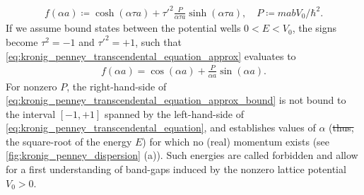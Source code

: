 \documentclass{svmono}
\providecommand{\DIFdeltex}[1]{{\protect\color{red}\sout{#1}}}                      %
\providecommand{\DIFdelbegin}{} %
\providecommand{\DIFdelend}{} %
\providecommand{\DIFdel}[1]{\texorpdfstring{\DIFdeltex{#1}}{}} %
\newcommand{\DIFscaledelfig}{0.5}
\newlength{\DIFdelgraphicswidth} %
\newlength{\DIFdelgraphicsheight} %
\newcommand{\DIFdelincludegraphics}[2][]{%
\sbox{\DIFdelgraphicsbox}{\DIFOincludegraphics[#1]{#2}}%
\settoboxwidth{\DIFdelgraphicswidth}{\DIFdelgraphicsbox} %
\settoboxtotalheight{\DIFdelgraphicsheight}{\DIFdelgraphicsbox} %
\scalebox{\DIFscaledelfig}{%
\parbox[b]{\DIFdelgraphicswidth}{\usebox{\DIFdelgraphicsbox}\\[-\baselineskip] \rule{\DIFdelgraphicswidth}{0em}}\llap{\resizebox{\DIFdelgraphicswidth}{\DIFdelgraphicsheight}{%
\setlength{\unitlength}{\DIFdelgraphicswidth}%
\begin{picture}(1,1)%
\thicklines\linethickness{2pt} %
{\color[rgb]{1,0,0}\put(0,0){\framebox(1,1){}}}%
{\color[rgb]{1,0,0}\put(0,0){\line( 1,1){1}}}%
{\color[rgb]{1,0,0}\put(0,1){\line(1,-1){1}}}%
\end{picture}%
}\hspace*{3pt}}} %
} %
\DeclareRobustCommand{\DIFdelbegin}{\DIFOdelbegin \let\includegraphics\DIFdelincludegraphics} %
\DeclareRobustCommand{\DIFdelend}{\DIFOaddend \let\includegraphics\DIFOincludegraphics} %
\begin{document}
\begin{align}
    f(\alpha a) \coloneqq \cosh(\alpha\tau a) + \tau'^2\frac{P}{\alpha\tau a}\sinh(\alpha\tau a),
    \quad
    P \coloneqq mabV_0/\hbar^2.
    \label{eq:kronig_penney_transcendental_equation_approx}
\end{align}
If we assume bound states between the potential wells $0<E<V_0$, the signs become $\tau^2=-1$ and $\tau'^2=+1$, such that \cref{eq:kronig_penney_transcendental_equation_approx} evaluates to
\begin{align}
    f(\alpha a) = \cos(\alpha a) + \frac{P}{\alpha a}\sin(\alpha a).
    \label{eq:kronig_penney_transcendental_equation_approx_bound}
\end{align}
For nonzero $P$, the right-hand-side of \cref{eq:kronig_penney_transcendental_equation_approx_bound} is not bound to the interval $[-1,+1]$ spanned by the left-hand-side of \cref{eq:kronig_penney_transcendental_equation}, and establishes values of $\alpha$ (\DIFdelbegin \DIFdel{thus, }\DIFdelend the square-root of the energy $E$) for which no (real) momentum exists (see \cref{fig:kronig_penney_dispersion} (a)).
Such energies are called forbidden and allow for a first understanding of band-gaps induced by the nonzero lattice potential $V_0>0$.
\end{document}
